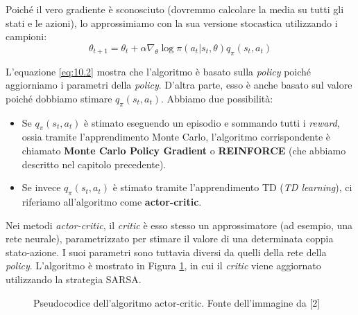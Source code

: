 ﻿\documentclass[11pt, a4paper]{report}
\begin{document}
Poiché il vero gradiente è sconosciuto (dovremmo calcolare la media su tutti gli stati e le azioni), lo approssimiamo con la sua versione stocastica utilizzando i campioni:
\begin{equation}
\theta_{t+1} = \theta_t + \alpha\nabla_\theta \log \pi(a_t | s_t, \theta)q_\pi(s_t, a_t) \label{eq:10.2}
\end{equation}

L'equazione \eqref{eq:10.2} mostra che l'algoritmo è basato sulla \emph{policy} poiché aggiorniamo i parametri della \emph{policy}. D'altra parte, esso è anche basato sul valore poiché dobbiamo stimare $q_\pi(s_t, a_t)$. Abbiamo due possibilità:
\begin{itemize}[noitemsep]
    \item Se $q_\pi(s_t, a_t)$ è stimato eseguendo un episodio e sommando tutti i \emph{reward}, ossia tramite l'apprendimento Monte Carlo, l'algoritmo corrispondente è chiamato \textbf{Monte Carlo Policy Gradient} o \textbf{REINFORCE} (che abbiamo descritto nel capitolo precedente).
    \item Se invece $q_\pi(s_t, a_t)$ è stimato tramite l'apprendimento TD (\emph{TD learning}), ci riferiamo all'algoritmo come \textbf{actor-critic}.
\end{itemize}

Nei metodi \emph{actor-critic}, il \emph{critic} è esso stesso un approssimatore (ad esempio, una rete neurale), parametrizzato per stimare il valore di una determinata coppia stato-azione. I suoi parametri sono tuttavia diversi da quelli della rete della \emph{policy}. L'algoritmo è mostrato in Figura \ref{fig:actor_critic_pseudo}, in cui il \emph{critic} viene aggiornato utilizzando la strategia SARSA.

\begin{figure}[H]
    \centering
    \caption{Pseudocodice dell'algoritmo actor-critic. Fonte dell'immagine da [2]}
    \label{fig:actor_critic_pseudo}
\end{figure}
\end{document}
